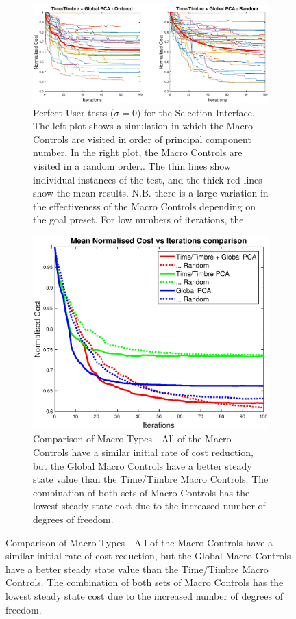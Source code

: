 \documentclass[11pt, oneside]{report}   	%
\begin{document}
\begin{figure}
	\caption{Perfect/Imperfect user tests for Selection Interface}
	\begin{subfigure}[b]{\textwidth}
\hspace{-60pt}
	\includegraphics[width = 8in]{PCAInterfaceTests1.eps}
	\vspace{-10pt}
	\caption{Perfect User tests ($\sigma = 0$) for the Selection Interface. The left plot shows a simulation in which the Macro Controls are visited in order of principal component number. In the right plot, the Macro Controls are visited in a random order.. The thin lines show individual instances of the test, and the thick red lines show the mean results. N.B. there is a large variation in the effectiveness of the Macro Controls depending on the goal preset. For low numbers of iterations, the }
	\label{fig:PCAtest1}
\end{subfigure}

\begin{subfigure}[b]{\textwidth}
	\centering
	\includegraphics[width = \textwidth]{PCAInterfaceTests2.eps}
	\caption{Comparison of Macro Types - All of the Macro Controls have a similar initial rate of cost reduction, but the Global Macro Controls have a better steady state value than the Time/Timbre Macro Controls. The combination of both sets of Macro Controls has the lowest steady state cost due to the increased number of degrees of freedom.}
	\label{fig:PCAtest2}
\end{subfigure}
\end{figure}
\end{document}
